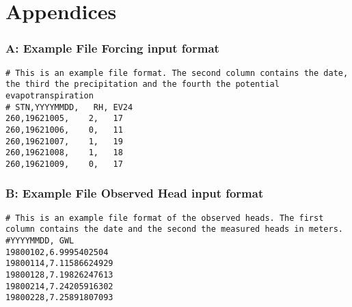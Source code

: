 \chapter{Appendices}

\subsection{A: Example File Forcing input format}


\begin{lstlisting}
# This is an example file format. The second column contains the date, the third the precipitation and the fourth the potential evapotranspiration
# STN,YYYYMMDD,   RH, EV24
260,19621005,    2,   17
260,19621006,    0,   11
260,19621007,    1,   19
260,19621008,    1,   18
260,19621009,    0,   17

\end{lstlisting}

\subsection{B: Example File Observed Head input format}

\begin{lstlisting}
# This is an example file format of the observed heads. The first column contains the date and the second the measured heads in meters. 
#YYYYMMDD, GWL 
19800102,6.9995402504
19800114,7.11586624929
19800128,7.19826247613
19800214,7.24205916302
19800228,7.25891807093

\end{lstlisting}